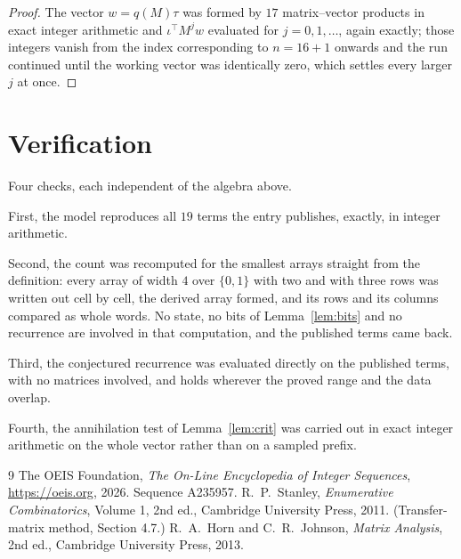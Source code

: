 \documentclass[11pt,a4paper]{article}
\theoremstyle{plain}
\theoremstyle{definition}
\begin{document}
\begin{proof}
The vector $w=q(M)\tau$ was formed by $17$ matrix--vector products in exact integer
arithmetic and $\iota^{\!\top}M^{j}w$ evaluated for $j=0,1,\dots$, again exactly; those
integers vanish from the index corresponding to $n=16+1$ onwards and the run continued
until the working vector was identically zero, which settles every larger $j$ at once.
\end{proof}

\section{Verification}

Four checks, each independent of the algebra above.

First, the model reproduces all $19$ terms the entry publishes, exactly, in integer
arithmetic.

Second, the count was recomputed for the smallest arrays straight from the definition: every
array of width $4$ over $\{0,1\}$ with two and with three rows was written out cell by cell,
the derived array formed, and its rows and its columns compared as whole words. No state, no
bits of Lemma~\ref{lem:bits} and no recurrence are involved in that computation, and the
published terms came back.

Third, the conjectured recurrence was evaluated directly on the published terms, with no
matrices involved, and holds wherever the proved range and the data overlap.

Fourth, the annihilation test of Lemma~\ref{lem:crit} was carried out in exact integer
arithmetic on the whole vector rather than on a sampled prefix.

\begin{thebibliography}{9}
 The OEIS Foundation, \emph{The On-Line Encyclopedia of Integer
Sequences}, \url{https://oeis.org}, 2026. Sequence A235957.
 R.~P.~Stanley, \emph{Enumerative Combinatorics}, Volume 1, 2nd ed.,
Cambridge University Press, 2011. (Transfer-matrix method, Section 4.7.)
 R.~A.~Horn and C.~R.~Johnson, \emph{Matrix Analysis}, 2nd ed., Cambridge
University Press, 2013.
\end{thebibliography}
\end{document}

